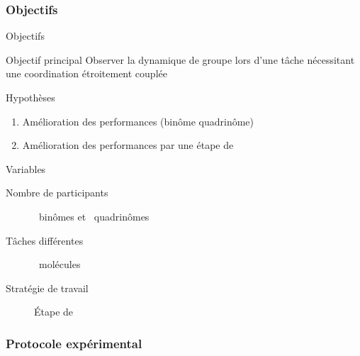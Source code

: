 \documentclass[english,french,dvips,10pt]{mybeamer}
\begin{document}
	\subsubsection{Objectifs}
	\begin{myframe}{Objectifs}
		\begin{myblock}{Objectif principal}
			Observer la dynamique de groupe lors d'une tâche nécessitant une coordination étroitement couplée
		\end{myblock}
		\begin{myplusblock}{Hypothèses}
			\begin{enumerate}
				\item Amélioration des performances (binôme \myvs quadrinôme)
				\item Amélioration des performances par une étape de \mybrainstorming {}
			\end{enumerate}
		\end{myplusblock}
		\begin{myblock}{Variables}
			\begin{description}
				\item[Nombre de participants] ~binômes et ~quadrinômes
				\item[Tâches différentes] ~molécules
				\item[Stratégie de travail] Étape de \mybrainstorming
			\end{description}
		\end{myblock}
	\end{myframe}
	\subsubsection{Protocole expérimental}
\end{document}
